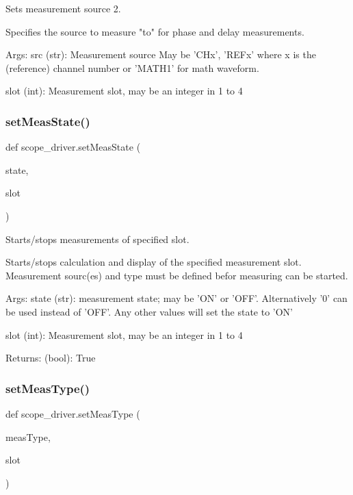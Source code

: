 \begin{DoxyVerb}Sets measurement source 2.

Specifies the source to measure "to" for phase and delay
measurements.

Args:
    src (str): Measurement source
        May be 'CHx', 'REFx' where x is the (reference) channel
        number or 'MATH1' for math waveform.
    
    slot (int): Measurement slot, may be an integer in 1 to 4\end{DoxyVerb}
 \mbox{\label{namespacescope__driver_a9fbe51f28cec4dc18f063dc1a3bd6fad}} 
\subsubsection{\texorpdfstring{set\+Meas\+State()}{setMeasState()}}
{\footnotesize\ttfamily def scope\+\_\+driver.\+set\+Meas\+State (\begin{DoxyParamCaption}\item[{}]{state,  }\item[{}]{slot }\end{DoxyParamCaption})}

\begin{DoxyVerb}Starts/stops measurements of specified slot.

Starts/stops calculation and display of the specified measurement
slot. Measurement sourc(es) and type must be defined befor measuring
can be started.

Args:
    state (str): measurement state; may be 'ON' or 'OFF'.
        Alternatively '0' can be used instead of 'OFF'. Any other
        values will set the state to 'ON'
    
    slot (int): Measurement slot, may be an integer in 1 to 4

Returns:
    (bool): True
\end{DoxyVerb}
 \mbox{\label{namespacescope__driver_afc9829fe08a35516938ebfff24f1d5f6}} 
\subsubsection{\texorpdfstring{set\+Meas\+Type()}{setMeasType()}}
{\footnotesize\ttfamily def scope\+\_\+driver.\+set\+Meas\+Type (\begin{DoxyParamCaption}\item[{}]{meas\+Type,  }\item[{}]{slot }\end{DoxyParamCaption})}

